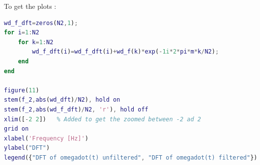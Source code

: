 \documentclass[a4paper,12pt]{article}
\begin{document}
\begin{enumerate}[label={\color{blue}\arabic*)}]
\begin{multicols}{2}
    \end{multicols}
    To get the plots :
    \begin{lstlisting}[style=Matlab-editor,language=Matlab, basicstyle=\small\ttfamily]
wd_f_dft=zeros(N2,1);
for i=1:N2
    for k=1:N2
        wd_f_dft(i)=wd_f_dft(i)+wd_f(k)*exp(-1i*2*pi*m*k/N2);
    end
end

figure(11)
stem(f_2,abs(wd_dft)/N2), hold on
stem(f_2,abs(wd_f_dft)/N2, 'r'), hold off
xlim([-2 2])   % Added to get the zoomed between -2 ad 2
grid on
xlabel('Frequency [Hz]')
ylabel("DFT")
legend({"DFT of omegadot(t) unfiltered", "DFT of omegadot(t) filtered"})
        \end{lstlisting}

\end{enumerate}
\end{document}
